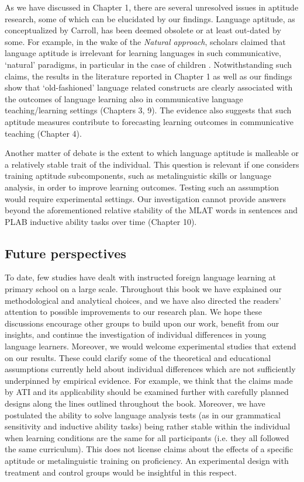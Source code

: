 \documentclass[output=paper]{langsci/langscibook}
\begin{document}
As we have discussed in Chapter 1, there are several unresolved issues in aptitude research, some of which can be elucidated by our findings. Language aptitude, as conceptualized by Carroll, has been deemed obsolete or at least out-dated by some. For example, in the wake of the \textit{Natural approach}, scholars claimed that language aptitude is irrelevant for learning languages in such communicative, ‘natural’ paradigms, in particular in the case of children \citep[72]{Skehan2002}. Notwithstanding such claims, the results in the literature reported in Chapter 1 as well as our findings show that ‘old-fashioned’ language related constructs are clearly associated with the outcomes of language learning also in communicative language teaching/learning settings (Chapters 3, 9). The evidence also suggests that such aptitude measures contribute to forecasting learning outcomes in communicative teaching (Chapter 4). 

Another matter of debate is the extent to which language aptitude is malleable or a relatively stable trait of the individual. This question is relevant if one considers training aptitude subcomponents, such as metalinguistic skills or language analysis, in order to improve learning outcomes. Testing such an assumption would require experimental settings. Our investigation cannot provide answers beyond the aforementioned relative stability of the MLAT words in sentences and PLAB inductive ability tasks over time (Chapter 10). 

\subsection{Future perspectives}

To date, few studies have dealt with instructed foreign language learning at primary school on a large scale. Throughout this book we have explained our methodological and analytical choices, and we have also directed the readers' attention to possible improvements to our research plan. We hope these discussions encourage other groups to build upon our work, benefit from our insights, and continue the investigation of individual differences in young language learners. Moreover, we would welcome experimental studies that extend on our results. These could clarify some of the theoretical and educational assumptions currently held about individual differences which are not sufficiently underpinned by empirical evidence. For example, we think that the claims made by ATI and its applicability should be examined further with carefully planned designs along the lines outlined throughout the book. Moreover, we have postulated the ability to solve language analysis tests (as in our grammatical sensitivity and inductive ability tasks) being rather stable within the individual when learning conditions are the same for all participants (i.e. they all followed the same curriculum). This does not license claims about the effects of a specific aptitude or metalinguistic training on proficiency. An experimental design with treatment and control groups would be insightful in this respect. 
\end{document}
